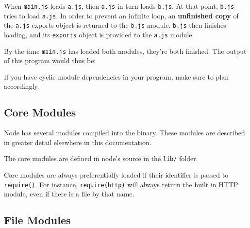 When \texttt{main.js} loads \texttt{a.js}, then \texttt{a.js} in turn
loads \texttt{b.js}. At that point, \texttt{b.js} tries to load
\texttt{a.js}. In order to prevent an infinite loop, an
\textbf{unfinished copy} of the \texttt{a.js} exports object is returned
to the \texttt{b.js} module. \texttt{b.js} then finishes loading, and
its \texttt{exports} object is provided to the \texttt{a.js} module.

By the time \texttt{main.js} has loaded both modules, they're both
finished. The output of this program would thus be:

\begin{Shaded}
\begin{Highlighting}[]
  \NormalTok{= }
  \NormalTok{= }
 \NormalTok{=}\NormalTok{, }\NormalTok{=}
\end{Highlighting}
\end{Shaded}

If you have cyclic module dependencies in your program, make sure to
plan accordingly.

\subsection{Core Modules}\label{core-modules}

Node has several modules compiled into the binary. These modules are
described in greater detail elsewhere in this documentation.

The core modules are defined in node's source in the \texttt{lib/}
folder.

Core modules are always preferentially loaded if their identifier is
passed to \texttt{require()}. For instance,
\texttt{require(\textquotesingle{}http\textquotesingle{})} will always
return the built in HTTP module, even if there is a file by that name.

\subsection{File Modules}\label{file-modules}


